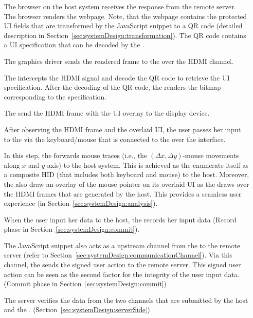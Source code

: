 \begin{mylist}
  \item[\one] The browser on the host system receives the response from the remote server. The browser renders the webpage. Note, that the webpage contains the protected UI fields that are transformed by the \name JavaScript snippet to a QR code (detailed description in Section~\ref{sec:systemDesign:transformation}). The QR code contains a UI specification that can be decoded by the \device.
  \item[\two] The graphics driver sends the rendered frame to the \device over the HDMI channel.
  \item[\three] The \device intercepts the HDMI signal and decode the QR code to retrieve the UI specification. After the decoding of the QR code, the \device renders the bitmap corresponding to the specification.
  \item[\four] The \device send the HDMI frame with the UI overlay to the display device.
  \item[\five] After observing the HDMI frame and the overlaid UI, the user passes her input to the \device via the keyboard/mouse that is connected to the \device over the \usb interface.
  \item[\six] In this step, the \device forwards mouse traces (i.e., the $(\Delta x,\Delta y)$-mouse movements along $x$ and $y$ axis) to the host system. This is achieved as the \device enumerate itself as a composite HID (that includes both keyboard and mouse) to the host. Moreover, the \device also draw an overlay of the mouse pointer on its overlaid UI as the \device draws over the HDMI frames that are generated by the host. This provides a seamless user experience (\Pop in Section~\ref{sec:systemDesign:analysis}).
  \item[\seven] When the user input her data to the host, the \device records her input data (Record phase in Section~\ref{sec:systemDesign:commit}).
  \item[\eight] The \name JavaScript snippet also acts as a upstream channel from the \device to the remote server (refer to Section~\ref{sec:systemDesign:communicationChannel}). Via this channel, the \device sends the signed user action to the remote server. This signed user action can be seen as the second factor for the integrity of the user input data. (Commit phase in Section~\ref{sec:systemDesign:commit})
  \item [\nine] The server verifies the data from the two channels that are submitted by the host and the \device. (Section~\ref{sec:systemDesign:serverSide})
\end{mylist}



